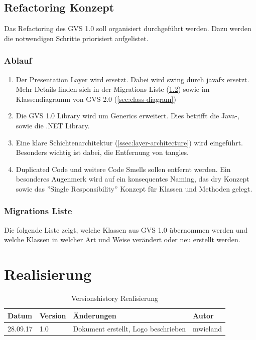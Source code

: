 \documentclass[11pt,a4paper,english,oneside]{book}
\numberwithin{equation}{chapter}
\begin{document}
	\section{Refactoring Konzept} \label{sec:refactroing-conpet}
	Das Refactoring des GVS 1.0 soll organisiert durchgeführt werden. Dazu werden die notwendigen Schritte priorisiert aufgelistet.
		
	\subsection{Ablauf}\label{ssec:ablauf}
	\begin{enumerate}
		\item Der Presentation Layer wird ersetzt. Dabei wird \gls{swing} durch \gls{javafx} ersetzt. Mehr Details finden sich in der Migrations Liste (\ref{ssec:class-refactroing-list}) sowie im Klassendiagramm von GVS 2.0 (\ref{sec:class-diagram})
		\item Die GVS 1.0 Library wird um Generics erweitert. Dies betrifft die Java-, sowie die .NET Library.
		\item Eine klare Schichtenarchitektur (\ref{ssec:layer-architecture}) wird eingeführt. Besonders wichtig ist dabei, die Entfernung von \gls{tangle}s.
		\item Duplicated Code und weitere Code Smells sollen entfernt werden. Ein besonderes Augenmerk wird auf ein konsequentes Naming, das \gls{dry} Konzept sowie das ''Single Responsibility'' Konzept für Klassen und Methoden gelegt.
	\end{enumerate}

	\subsection{Migrations Liste}
	\label{ssec:class-refactroing-list}
	Die folgende Liste zeigt, welche Klassen aus GVS 1.0 übernommen werden und welche Klassen in welcher Art und Weise verändert oder neu erstellt werden.
	
	
	
	\chapter{Realisierung}
		
	\begin{table}[h!]
	\centering
	\begin{tabularx}{\linewidth}{l l X l}
		\toprule 
		Datum & Version & Änderungen & Autor \\
		\midrule
		28.09.17 & 1.0 & Dokument erstellt, Logo beschrieben & mwieland \\
		\bottomrule 
	\end{tabularx} 
	\caption{Versionshistory Realisierung} 
	\end{table}
	
\end{document}
